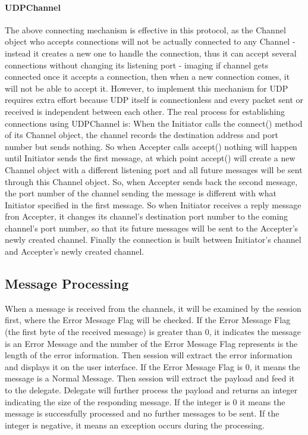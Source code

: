 \paragraph{UDPChannel}
The above connecting mechanism is effective in this protocol, as the Channel object who accepts connections will not be actually connected to any Channel - instead it creates a new one to handle the connection, thus it can accept several connections without changing its listening port - imaging if channel gets connected once it accepts a connection, then when a new connection comes, it will not be able to accept it. However, to implement this mechanism for UDP requires extra effort because UDP itself is connectionless and every packet sent or received is independent between each other. The real process for establishing connections using UDPChannel is: When the Initiator calls the connect() method of its Channel object, the channel records the destination address and port number but sends nothing. So when Accepter calls accept() nothing will happen until Initiator sends the first message, at which point accept() will create a new Channel object with a different listening port and all future messages will be sent through this Channel object. So, when Accepter sends back the second message, the port number of the channel sending the message is different with what Initiator specified in the first message. So when Initiator receives a reply message fron Accepter, it changes its channel's destination port number to the coming channel's port number, so that its future messages will be sent to the Accepter's newly created channel. Finally the connection is built between Initiator's channel and Accepter's newly created channel.

\subsection{Message Processing}
When a message is received from the channels, it will be examined by the session first, where the Error Message Flag will be checked. If the Error Message Flag (the first byte of the received message) is greater than 0, it indicates the message is an Error Message and the number of the Error Message Flag represents is the length of the error information. Then session will extract the error information and displays it on the user interface. If the Error Message Flag is 0, it means the message is a Normal Message. Then session will extract the payload and feed it to the delegate. Delegate will further process the payload and returns an integer indicating the size of the responding message. If the integer is 0 it means the message is successfully processed and no further messages to be sent. If the integer is negative, it means an exception occurs during the processing.


